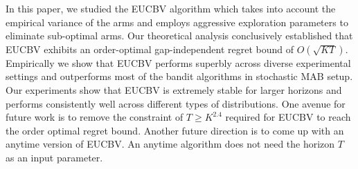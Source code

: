 In this paper, we studied the EUCBV algorithm which takes into account the empirical variance of the arms and employs aggressive exploration parameters to eliminate sub-optimal arms. Our theoretical analysis conclusively established that EUCBV exhibits an order-optimal gap-independent regret bound of $O\left(\sqrt{KT}\right)$. Empirically we show that EUCBV performs superbly across diverse experimental settings and outperforms most of the bandit algorithms in stochastic  MAB setup. Our experiments show that EUCBV is extremely stable for larger horizons and performs consistently well across different types of distributions. One avenue for future work is to remove the constraint of $T\geq K^{2.4}$ required for EUCBV to reach the order optimal regret bound. Another future direction is to come up with an anytime version of EUCBV. An anytime algorithm does not need the horizon $T$ as an input parameter.


